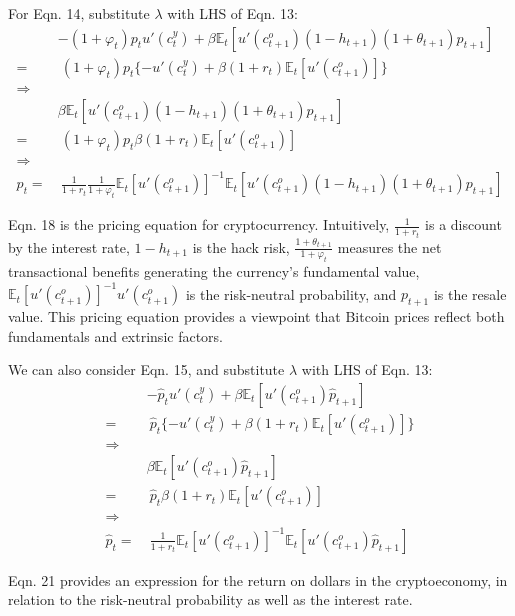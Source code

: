 \documentclass[12pt]{article}
\begin{document}
\noindent
For Eqn. 14, substitute $\lambda$ with LHS of Eqn. 13:
\begin{align}
    &-(1+\varphi_t) p_t  u'(c_t^y) + \beta \mathbb{E}_t[u'(c_{t+1}^o)(1-h_{t+1})(1+\theta_{t+1})p_{t+1}] \nonumber \\
=&\ (1+\varphi_t)p_t
\{-u'(c_t^y) + \beta(1+r_t) \mathbb{E}_t[u'(c_{t+1}^o)]\} \\
\Rightarrow& \nonumber \\
&\beta \mathbb{E}_t[u'(c_{t+1}^o)(1-h_{t+1})(1+\theta_{t+1})p_{t+1}] \nonumber \\
=&\ (1+\varphi_t)p_t\beta(1+r_t) \mathbb{E}_t[u'(c_{t+1}^o)] \\
\Rightarrow & \nonumber \\
p_t=&\ \frac{1}{1+r_t} \frac{1}{1+\varphi_t}\mathbb{E}_t[u'(c_{t+1}^o)]^{-1} \mathbb{E}_t[u'(c_{t+1}^o)(1-h_{t+1})(1+\theta_{t+1})p_{t+1}]
\end{align}

Eqn. 18 is the pricing equation for cryptocurrency. Intuitively, $\frac{1}{1+r_t}$ is a discount by the interest rate, $1-h_{t+1}$ is the hack risk, $\frac{1+\theta_{t+1}}{1+\varphi_t}$ measures the net transactional benefits generating the currency's fundamental value, $\mathbb{E}_t[u'(c_{t+1}^o)]^{-1}u'(c_{t+1}^o)$ is the risk-neutral probability, and $p_{t+1}$ is the resale value. This pricing equation provides a viewpoint that Bitcoin prices reflect both fundamentals and extrinsic factors.

We can also consider Eqn. 15, and substitute $\lambda$ with LHS of Eqn. 13:
\begin{align}
&-\hat{p}_t u'(c_t^y) + \beta \mathbb{E}_t[u'(c_{t+1}^o) \hat{p}_{t+1}] \nonumber \\
=&\ \hat{p}_t \{-u'(c_t^y) + \beta(1+r_t) \mathbb{E}_t[u'(c_{t+1}^o)]\} \\
\Rightarrow& \nonumber \\
& \beta\mathbb{E}_t[u'(c_{t+1}^o) \hat{p}_{t+1}] \nonumber \\
=&\ \hat{p}_t \beta(1+r_t) \mathbb{E}_t[u'(c_{t+1}^o)] \\
\Rightarrow & \nonumber \\
\hat{p}_t =&\ \frac{1}{1+r_t} \mathbb{E}_t[u'(c_{t+1}^o)]^{-1} \mathbb{E}_t[u'(c_{t+1}^o) \hat{p}_{t+1}]
\end{align}

Eqn. 21 provides an expression for the return on dollars in the cryptoeconomy, in relation to the risk-neutral probability as well as the interest rate. 
\end{document}
